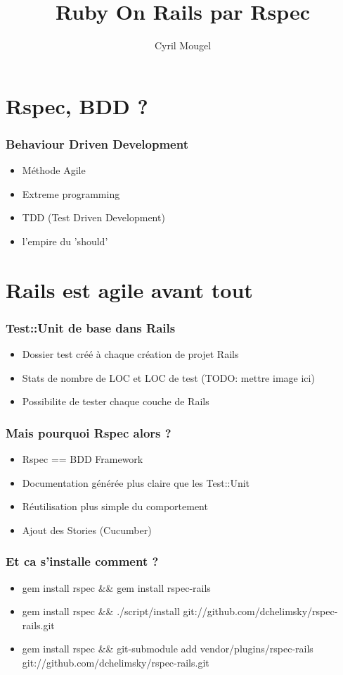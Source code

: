 \documentclass{beamer}
\title{Ruby On Rails par Rspec}
\author{Cyril Mougel}
\begin{document}
\begin{frame}
    \titlepage
\end{frame}

\section{Rspec, BDD ?}

\begin{frame}
	\frametitle{Behaviour Driven Development}
	\begin{itemize}
		\item M\'ethode Agile
		\item Extreme programming
		\item TDD (Test Driven Development)
        \item l'empire du 'should'
	\end{itemize}
\end{frame}

\section{Rails est agile avant tout}

\begin{frame}
    \frametitle{Test::Unit de base dans Rails}
    \begin{itemize}
        \item Dossier test cr\'e\'e \`a chaque cr\'eation de projet Rails
        \item Stats de nombre de LOC et LOC de test (TODO: mettre image ici)
        \item Possibilite de tester chaque couche de Rails
    \end{itemize}
\end{frame}

\begin{frame}
    \frametitle{Mais pourquoi Rspec alors ?}
    \begin{itemize}
        \item Rspec == BDD Framework
        \item Documentation g\'en\'er\'ee plus claire que les Test::Unit
        \item R\'eutilisation plus simple du comportement
        \item Ajout des Stories (Cucumber)
    \end{itemize}
\end{frame}

\begin{frame}
    \frametitle{Et ca s'installe comment ?}
    \begin{itemize}
        \item gem install rspec \&\& gem install rspec-rails
        \item gem install rspec \&\& ./script/install git://github.com/dchelimsky/rspec-rails.git
        \item gem install rspec \&\& git-submodule add vendor/plugins/rspec-rails git://github.com/dchelimsky/rspec-rails.git
    \end{itemize}
\end{frame}
\end{document}
